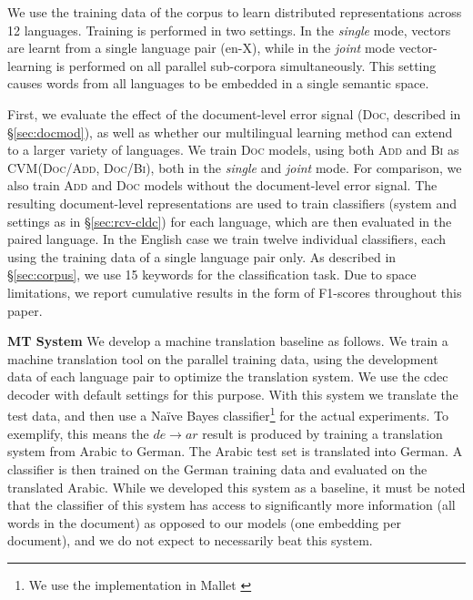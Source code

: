 \documentclass[11pt]{article}
\newcommand{\addMod}{\textsc{Add}\xspace}
\newcommand{\flatMod}{\textsc{Bi}\xspace}
\newcommand{\docMod}{\textsc{Doc}\xspace}
\newcommand{\docModadd}{\textsc{Doc/Add}\xspace}
\newcommand{\docModflat}{\textsc{Doc/Bi}\xspace}
\newcommand{\CVM}{\textsc{CVM}\xspace}
\newcommand{\single}{\textit{single}\xspace}
\newcommand{\joint}{\textit{joint}\xspace}
\begin{document}
We use the training data of the corpus to learn distributed representations
across 12 languages. Training is performed in two settings. In the \single
mode, vectors are learnt from a single language pair (en-X), while in the \joint
mode vector-learning is performed on all parallel sub-corpora simultaneously.
This setting causes words from all languages to be embedded in a single semantic
space.

First, we evaluate the effect of the document-level error signal (\docMod,
  described in \S\ref{sec:docmod}), as well as whether our multilingual learning
method can extend to a larger variety of languages. We train \docMod models,
using both \addMod and \flatMod as \CVM (\docModadd, \docModflat), both in the
\single and \joint mode. For comparison, we also train \addMod and \docMod
models without the document-level error signal.  The resulting document-level
representations are used to train classifiers (system and settings as in
  \S\ref{sec:rcv-cldc}) for each language, which are then evaluated in the
paired language. In the English case we train twelve individual classifiers,
each using the training data of a single language pair only.  As described in
\S\ref{sec:corpus}, we use 15 keywords for the classification task.  Due to
space limitations, we report cumulative results in the form of F1-scores
throughout this paper.

\vspace{0.05in}
\noindent\textbf{MT System}\hspace{0.1in}
We develop a machine translation baseline as follows.  We train a
machine translation tool on the parallel training data, using the development
data of each language pair to optimize the translation system.  We use the cdec
decoder \cite{Dyer:2010} with default settings for this purpose.  With this
system we translate the test data, and then use a Na\"{i}ve Bayes
classifier\footnote{We use the implementation in Mallet \cite{McCallum:2002}}
for the actual experiments.  To exemplify, this means the $de{\to}ar$ result is
produced by training a translation system from Arabic to German. The Arabic
test set is translated into German. A classifier is then trained on the German
training data and evaluated on the translated Arabic. While we developed this
system as a baseline, it must be noted that the classifier of this system has
access to significantly more information (all words in the document) as opposed
to our models (one embedding per document), and we do not expect to necessarily
beat this system.
\end{document}
